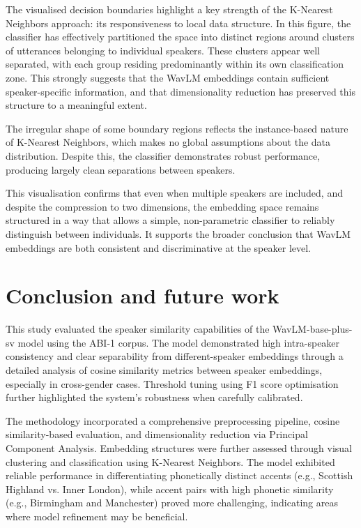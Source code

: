 \documentclass[conference]{IEEEtran}
\begin{document}
	The visualised decision boundaries highlight a key strength of the K-Nearest Neighbors approach: its responsiveness to local data structure. In this figure, the classifier has effectively partitioned the space into distinct regions around clusters of utterances belonging to individual speakers. These clusters appear well separated, with each group residing predominantly within its own classification zone. This strongly suggests that the WavLM embeddings contain sufficient speaker-specific information, and that dimensionality reduction has preserved this structure to a meaningful extent.
	
	The irregular shape of some boundary regions reflects the instance-based nature of K-Nearest Neighbors, which makes no global assumptions about the data distribution. Despite this, the classifier demonstrates robust performance, producing largely clean separations between speakers.
	
	This visualisation confirms that even when multiple speakers are included, and despite the compression to two dimensions, the embedding space remains structured in a way that allows a simple, non-parametric classifier to reliably distinguish between individuals. It supports the broader conclusion that WavLM embeddings are both consistent and discriminative at the speaker level.
	
	
	
	\section{Conclusion and future work}
	
	
	
	This study evaluated the speaker similarity capabilities of the WavLM-base-plus-sv model using the ABI-1 corpus. The model demonstrated high intra-speaker consistency and clear separability from different-speaker embeddings through a detailed analysis of cosine similarity metrics between speaker embeddings, especially in cross-gender cases. Threshold tuning using F1 score optimisation further highlighted the system's robustness when carefully calibrated.
	
	The methodology incorporated a comprehensive preprocessing pipeline, cosine similarity-based evaluation, and dimensionality reduction via Principal Component Analysis. Embedding structures were further assessed through visual clustering and classification using K-Nearest Neighbors. The model exhibited reliable performance in differentiating phonetically distinct accents (e.g., Scottish Highland vs. Inner London), while accent pairs with high phonetic similarity (e.g., Birmingham and Manchester) proved more challenging, indicating areas where model refinement may be beneficial.
	
\end{document}
